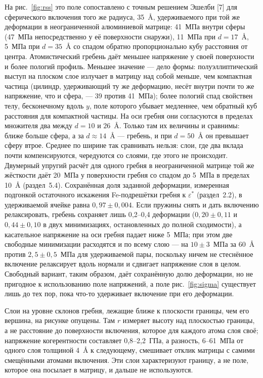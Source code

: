 На рис.~\ref{fig:rss} это поле сопоставлено с точным решением Эшелби [7]
для сферического включения того же радиуса, 35~\AA{}, удерживаемого при
той же деформации в неограниченной алюминиевой матрице: 41~МПа внутри
сферы (47~МПа непосредственно у её поверхности снаружи), 11~МПа при $d = 17$~\AA{}, 5~МПа при $d = 35$~\AA{} со
спадом обратно пропорционально кубу расстояния от центра. Атомистический гребень даёт меньшее напряжение у своей поверхности и более
пологий профиль. Меньшее значение --- дело формы: полуэллиптический выступ на
плоском слое излучает в матрицу над собой меньше, чем компактная частица
(цилиндр, удерживающий ту же деформацию, несёт внутри почти то же напряжение,
что и сфера, --- 39 против 41~МПа); более пологий спад свойствен телу,
бесконечному вдоль $y$, поле которого убывает медленнее, чем обратный куб
расстояния для компактной частицы. На оси гребня они согласуются в пределах множителя два между $d = 10$ и
$26$~\AA{}. Только там их величины и сравнимы: ближе больше сфера, а за
$d \approx 14$~\AA{} --- гребень, и при $d = 50$~\AA{} он превышает сферу
втрое. Среднее по ширине так сравнивать нельзя: слои, где два вклада почти
компенсируются, чередуются со слоями, где этого не происходит. Двумерный упругий расчёт для одного
гребня в неограниченной матрице той же жёсткости даёт 20~МПа у поверхности
гребня со спадом до 5~МПа в пределах 10~\AA{} (раздел~5.4). Сохранённая
доля заданной деформации, измеренная подгонкой остаточного искажения
Fe-подрешётки гребня к $\varepsilon^{*}$ (раздел~2.2), в удерживаемой
ячейке равна $0{,}97 \pm 0{,}004$. Если пружины снять и дать включению релаксировать, гребень сохраняет лишь
0{,}2--0{,}4 деформации ($0{,}20 \pm 0{,}11$ и $0{,}44 \pm 0{,}10$ в двух
минимизациях, остановленных до полной сходимости), а касательное напряжение
на оси гребня падает ниже 5~МПа; при этом две свободные минимизации расходятся и по всему слою --- на
$10 \pm 3$~МПа за 60~\AA{} против $2{,}5 \pm 0{,}5$~МПа для удерживаемой
пары, поскольку ничем не стеснённое включение релаксирует вдоль нормали и
сдвигает напряжение слоя в целом. Свободный вариант, таким образом, даёт
сохранённую долю деформации, но не пригодное к использованию поле
напряжений, а поле рис.~\ref{fig:sigma} существует лишь до тех пор, пока
что-то удерживает включение при его деформации.

Слои на уровне склонов гребня, лежащие ближе к плоскости границы, чем его
вершина, на рисунке опущены. Там $r$ измеряет высоту над плоскостью границы,
а не расстояние до поверхности включения, которое для каждого атома слоя
своё; напряжение когерентности составляет 0{,}8--2{,}2~ГПа, а разность,
6--61~МПа от одного слоя толщиной 4~\AA{} к следующему, смешивает отклик
матрицы с самими смещёнными атомами включения. Эти слои характеризуют
границу, а не поле, которое она посылает в матрицу, и дальше не
используются.

